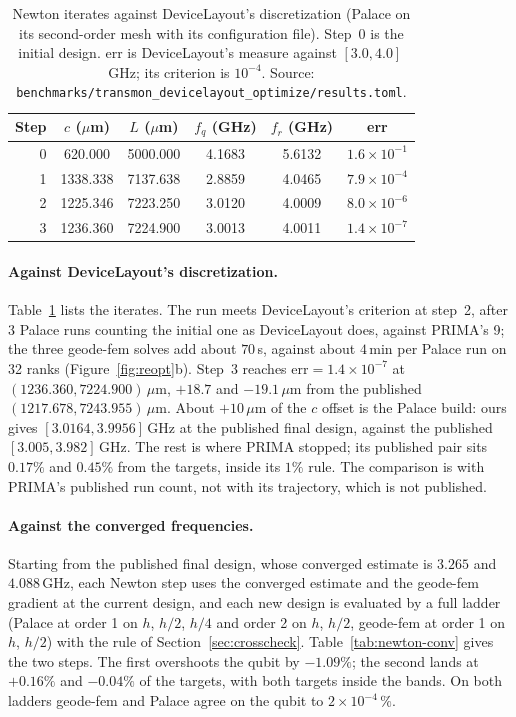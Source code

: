 \documentclass{anvil-paper}
\begin{document}
\begin{table}[tbp]
  \centering
  \caption{Newton iterates against DeviceLayout's discretization (Palace on
  its second-order mesh with its configuration file). Step~0 is the
  initial design. err is DeviceLayout's measure against $[3.0, 4.0]$\,GHz;
  its criterion is $10^{-4}$. Source:
  \texttt{benchmarks/transmon\_devicelayout\_optimize/results.toml}.}
  \label{tab:newton-dl}
  \small
  \begin{tabular}{@{}rccccc@{}}
    \toprule
    Step & $c$ ($\mu$m) & $L$ ($\mu$m) & $f_q$ (GHz) & $f_r$ (GHz) & err \\
    \midrule
    0 & 620.000 & 5000.000 & 4.1683 & 5.6132 & $1.6\times10^{-1}$ \\
    1 & 1338.338 & 7137.638 & 2.8859 & 4.0465 & $7.9\times10^{-4}$ \\
    2 & 1225.346 & 7223.250 & 3.0120 & 4.0009 & $8.0\times10^{-6}$ \\
    3 & 1236.360 & 7224.900 & 3.0013 & 4.0011 & $1.4\times10^{-7}$ \\
    \bottomrule
  \end{tabular}
\end{table}

\paragraph{Against DeviceLayout's discretization.}
Table~\ref{tab:newton-dl} lists the iterates. The run meets DeviceLayout's
criterion at step~2, after 3 Palace runs counting the initial one as
DeviceLayout does, against PRIMA's 9; the three geode-fem solves add about
$70$\,s, against about $4$\,min per Palace run on 32 ranks
(Figure~\ref{fig:reopt}b). Step~3 reaches $\mathrm{err} =
1.4\times10^{-7}$ at $(1236.360, 7224.900)\,\mu$m, $+18.7$ and
$-19.1\,\mu$m from the published $(1217.678, 7243.955)\,\mu$m. About
$+10\,\mu$m of the $c$ offset is the Palace build: ours gives
$[3.0164, 3.9956]$\,GHz at the published final design, against the
published $[3.005, 3.982]$\,GHz. The rest is where PRIMA stopped; its
published pair sits $0.17\%$ and $0.45\%$ from the targets, inside its
$1\%$ rule. The comparison is with PRIMA's published run count, not with
its trajectory, which is not published.

\paragraph{Against the converged frequencies.}
Starting from the published final design, whose converged estimate is
$3.265$ and $4.088$\,GHz, each Newton step uses the converged estimate and the geode-fem
gradient at the current design, and each new design is evaluated by a
full ladder (Palace at order 1 on $h$, $h/2$, $h/4$ and order 2 on $h$,
$h/2$, geode-fem at order 1 on $h$, $h/2$) with the rule of
Section~\ref{sec:crosscheck}. Table~\ref{tab:newton-conv} gives the two
steps. The first overshoots the qubit by $-1.09\%$; the second lands at
$+0.16\%$ and $-0.04\%$ of the targets, with both targets inside the
bands. On both ladders geode-fem and Palace agree on the qubit to
$2\times10^{-4}\,\%$.
\end{document}
